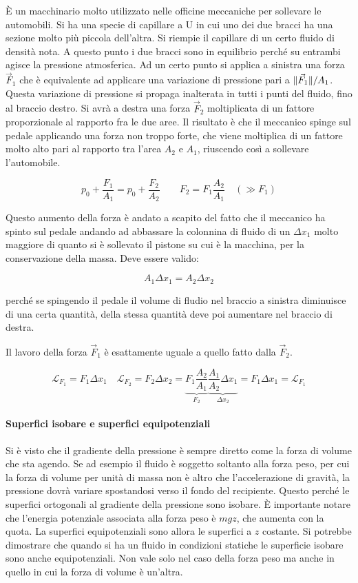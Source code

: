 \FloatBarrier
È un macchinario molto utilizzato nelle officine meccaniche per sollevare le automobili.  Si ha una specie di capillare a U in cui uno dei due bracci ha una sezione molto più piccola dell'altra. Si riempie il capillare di un certo fluido di densità nota. A questo punto i due bracci sono in equilibrio perché su entrambi agisce la pressione atmosferica. Ad un certo punto si applica a sinistra una forza $\vec{F}_1$ che è equivalente ad applicare una variazione di pressione pari a $\lVert\vec{F}_1\rVert/A_1$. Questa variazione di pressione si propaga inalterata in tutti i punti del fluido, fino al braccio destro. Si avrà a destra una forza $\vec{F}_2$ moltiplicata di un fattore proporzionale al rapporto fra le due aree. Il risultato è che il meccanico spinge sul pedale applicando una forza non troppo forte, che viene moltiplica di un fattore molto alto pari al rapporto tra l'area $A_2$ e $A_1$, riuscendo così a sollevare l'automobile.

\[
	p_0+ \frac{F_1 }{A_1 } = p_0 + \frac{F_2 }{A_2 } \qquad F_2 = F_1\frac{A_2 }{A_1 } \quad (\gg F_1 )
\]

Questo aumento della forza è andato a scapito del fatto che il meccanico ha spinto sul pedale andando ad abbassare la colonnina di fluido di un $\Delta x_1$ molto maggiore di quanto si è sollevato il pistone su cui è la macchina, per la conservazione della massa. Deve essere valido:

\[
	A_1\Delta x_1 = A_2\Delta x_2
\]

perché se spingendo il pedale il volume di fludio nel braccio a sinistra diminuisce di una certa quantità, della stessa quantità deve poi aumentare nel braccio di destra.

Il lavoro della forza $\vec{F}_1$ è esattamente uguale a quello fatto dalla $\vec{F}_2$.

\[
	\mathcal{L}_{F_1 } = F_1 \Delta x_1 \quad \mathcal{L}_{F_2 } = F_2 \Delta x_2 = \underbrace{F_1\frac{A_2}{A_1} }_{F_2} \underbrace{\frac{A_1}{A_2}\Delta x_1}_{\Delta x_2 } = F_1 \Delta x_1 = \mathcal{L}_{F_1}
\]

\paragraph{Superfici isobare e superfici equipotenziali} Si è visto che il gradiente della pressione è sempre diretto come la forza di volume che sta agendo. Se ad esempio il fluido è soggetto soltanto alla forza peso, per cui la forza di volume per unità di massa non è altro che l'accelerazione di gravità, la pressione dovrà variare spostandosi verso il fondo del recipiente. Questo perché le superfici ortogonali al gradiente della pressione sono isobare. È importante notare che l'energia potenziale associata alla forza peso è $mgz$, che aumenta con la quota. La superfici equipotenziali sono allora le superfici a $z$ costante. Si potrebbe dimostrare che quando si ha un fluido in condizioni statiche le superficie isobare sono anche equipotenziali. Non vale solo nel caso della forza peso ma anche in quello in cui la forza di volume è un'altra.

